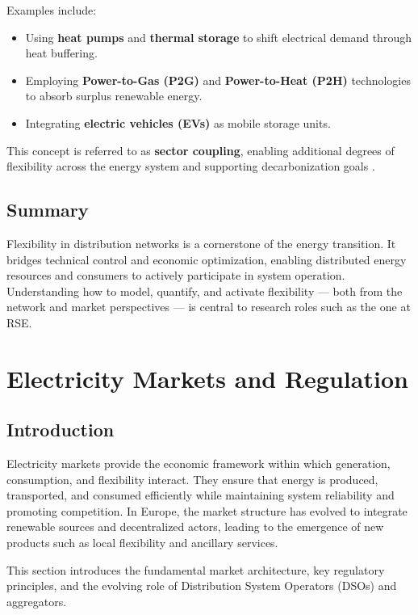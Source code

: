 \documentclass[11pt]{article}
\begin{document}
	Examples include:
	\begin{itemize}
		\item Using \textbf{heat pumps} and \textbf{thermal storage} to shift electrical demand through heat buffering.
		\item Employing \textbf{Power-to-Gas (P2G)} and \textbf{Power-to-Heat (P2H)} technologies to absorb surplus renewable energy.
		\item Integrating \textbf{electric vehicles (EVs)} as mobile storage units.
	\end{itemize}
	
	This concept is referred to as \textbf{sector coupling}, enabling additional degrees of flexibility across the energy system and supporting decarbonization goals \cite{IEA_sectorcoupling2021}.
	
	\subsection*{Summary}
	
	Flexibility in distribution networks is a cornerstone of the energy transition.  
	It bridges technical control and economic optimization, enabling distributed energy resources and consumers to actively participate in system operation.  
	Understanding how to model, quantify, and activate flexibility — both from the network and market perspectives — is central to research roles such as the one at RSE.
	
	
	\section{Electricity Markets and Regulation}
	
	\subsection{Introduction}
	
	Electricity markets provide the economic framework within which generation, consumption, and flexibility interact.  
	They ensure that energy is produced, transported, and consumed efficiently while maintaining system reliability and promoting competition.  
	In Europe, the market structure has evolved to integrate renewable sources and decentralized actors, leading to the emergence of new products such as local flexibility and ancillary services.
	
	This section introduces the fundamental market architecture, key regulatory principles, and the evolving role of Distribution System Operators (DSOs) and aggregators.
	
\end{document}
